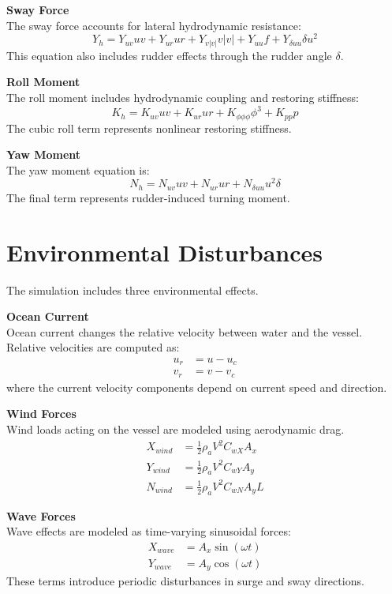 \documentclass[12pt,a4paper]{report}
\begin{document}
\textbf{Sway Force} \\
The sway force accounts for lateral hydrodynamic resistance:
\begin{equation}
    Y_h = Y_{uv}uv + Y_{ur}ur + Y_{v|v|}v|v| + Y_{uu}f + Y_{\delta uu}\delta u^2
\end{equation}
This equation also includes rudder effects through the rudder angle $\delta$.

\textbf{Roll Moment} \\
The roll moment includes hydrodynamic coupling and restoring stiffness:
\begin{equation}
    K_h = K_{uv}uv + K_{ur}ur + K_{\phi\phi\phi}\phi^3 + K_{pp}p
\end{equation}
The cubic roll term represents nonlinear restoring stiffness.

\textbf{Yaw Moment} \\
The yaw moment equation is:
\begin{equation}
    N_h = N_{uv}uv + N_{ur}ur + N_{\delta uu}u^2\delta
\end{equation}
The final term represents rudder-induced turning moment.

\section{Environmental Disturbances}
The simulation includes three environmental effects.

\textbf{Ocean Current} \\
Ocean current changes the relative velocity between water and the vessel. Relative velocities are computed as:
\begin{align}
    u_r &= u - u_c \\
    v_r &= v - v_c
\end{align}
where the current velocity components depend on current speed and direction.

\textbf{Wind Forces} \\
Wind loads acting on the vessel are modeled using aerodynamic drag.
\begin{align}
    X_{wind} &= \frac{1}{2} \rho_a V^2 C_{wX} A_x \\
    Y_{wind} &= \frac{1}{2} \rho_a V^2 C_{wY} A_y \\
    N_{wind} &= \frac{1}{2} \rho_a V^2 C_{wN} A_y L
\end{align}

\textbf{Wave Forces} \\
Wave effects are modeled as time-varying sinusoidal forces:
\begin{align}
    X_{wave} &= A_x \sin(\omega t) \\
    Y_{wave} &= A_y \cos(\omega t)
\end{align}
These terms introduce periodic disturbances in surge and sway directions.
\end{document}
